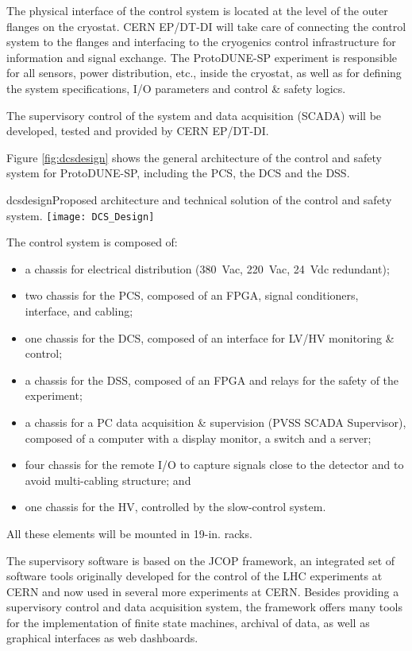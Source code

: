 The physical interface of the control system is located at the level of the outer flanges on the cryostat. 
 CERN EP/DT-DI will take care of connecting the control system to the flanges and interfacing to the cryogenics control infrastructure for information and signal exchange. 
The ProtoDUNE-SP experiment is responsible for all sensors, power distribution, etc., inside the cryostat, %
as well as for defining the system specifications, I/O parameters and control \& safety logics. 
 
The supervisory control of the system and data acquisition (SCADA) will be developed, tested and provided by CERN EP/DT-DI.	%

Figure \ref{fig:dcsdesign} shows the general architecture of the control and safety system for ProtoDUNE-SP, including the PCS, the DCS and the DSS.

\begin{cdrfigure}{dcsdesign}{Proposed architecture and technical solution of the control and safety system.}
\texttt{[image: DCS\_Design]}
\end{cdrfigure}

The control system is composed of:
\begin{itemize}
\item a chassis for electrical distribution (380~Vac, 220~Vac, 24~Vdc redundant);
\item two chassis for the PCS, composed of an FPGA, signal conditioners, interface, and cabling;
\item  one chassis for the DCS,  composed of an interface for LV/HV monitoring \& control; 
\item a chassis for the DSS, composed of an FPGA and relays for the safety of the experiment; 
\item a chassis for a PC data acquisition \& supervision (PVSS SCADA Supervisor), composed of a computer with a display monitor, a switch and a server; 
\item four chassis for the remote I/O to capture signals close to the detector and to avoid multi-cabling structure; and
\item  one chassis for the HV, controlled by the slow-control system. 
\end{itemize}
All these elements will be mounted in 19-in. racks.

The supervisory software is based on the JCOP framework, an integrated set of software tools originally developed for the control of the LHC experiments at CERN and now used in several more experiments at CERN. Besides providing a supervisory control and data acquisition system, the framework offers many tools for the implementation of finite state machines, archival of data, as well as graphical interfaces as web dashboards.

